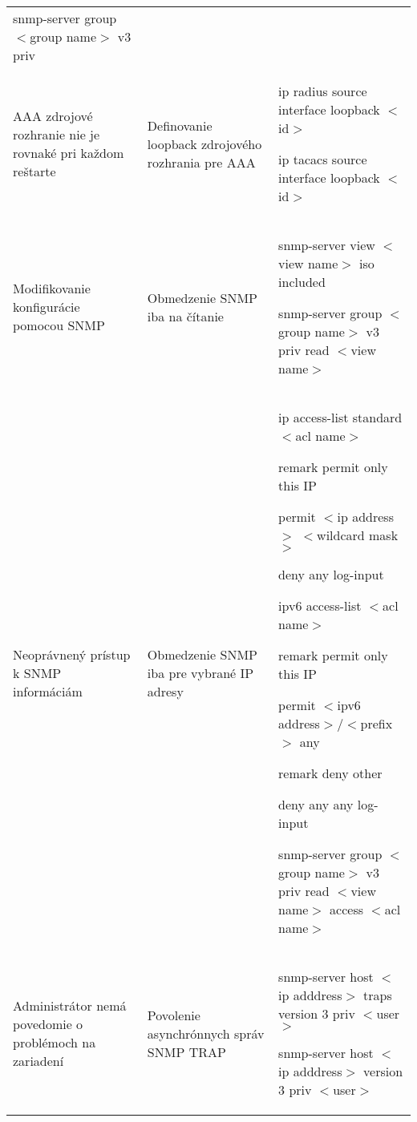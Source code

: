 \begin{longtable}[!htbp]{|L{10em}L{10em}L{34em}|}
	snmp-server group $<$group name$>$ v3 priv \\
	
	
	
	
	 AAA zdrojové rozhranie nie je rovnaké pri každom reštarte	&Definovanie loopback zdrojového rozhrania pre AAA	&ip radius source interface loopback $<$id$>$
	
	ip tacacs source interface loopback $<$id$>$\\
	
	
	
	
	Modifikovanie konfigurácie pomocou SNMP	&Obmedzenie SNMP iba na čítanie	&snmp-server view $<$view name$>$ iso included
	
	snmp-server group $<$group name$>$ v3 priv read $<$view name$>$\\
	
	
	
	
	 Neoprávnený prístup k SNMP informáciám	&Obmedzenie SNMP iba pre vybrané IP adresy	&ip access-list standard $<$acl name$>$
	
	\hspace{0.5em}remark permit only this IP 
	
	\hspace{0.5em}permit $<$ip address$>$ $<$wildcard mask$>$

	\hspace{0.5em}deny any log-input
	\vspace{0.5em}
	
	ipv6 access-list $<$acl name$>$
	
	\hspace{0.5em}remark permit only this IP 
	
	\hspace{0.5em}permit $<$ipv6 address$>$/$<$prefix$>$ any
	
	\hspace{0.5em}remark deny other
	
	\hspace{0.5em}deny any any log-input
	
	snmp-server group $<$group name$>$ v3 priv read $<$view name$>$  access $<$acl name$>$\\
	
	
	
	
	Administrátor nemá povedomie o problémoch na zariadení	&Povolenie asynchrónnych správ SNMP TRAP	&snmp-server host $<$ip adddress$>$ traps version 3 priv $<$user$>$
	
	snmp-server host $<$ip adddress$>$ version 3 priv $<$user$>$\\
	

\end{longtable}
